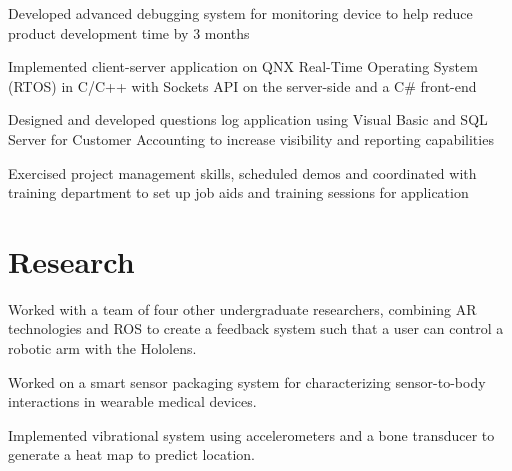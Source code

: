 \documentclass[]{deedy-resume-openfont}
\begin{document}
\begin{minipage}[t]{0.66\textwidth}
\begin{tightemize}
\item Developed advanced debugging system for monitoring device to help reduce product development time by 3 months\item Implemented client-server application on QNX Real-Time Operating System (RTOS) in C/C++ with Sockets API on the server-side and  a C\# front-end \end{tightemize}
\sectionsep

\begin{tightemize}
\item Designed and developed questions log application using Visual Basic and SQL Server for Customer Accounting to increase visibility and reporting capabilities \item	Exercised project management skills, scheduled demos and coordinated with training department to set up job aids and training sessions for application \end{tightemize}
\sectionsep


\section{Research}
\begin{tightemize}
\item Worked with a team of four other undergraduate researchers, combining AR technologies and ROS to create a feedback system such that a user can control a robotic arm with the Hololens.
\end{tightemize}

\sectionsep

\begin{tightemize}
\item Worked on a smart sensor packaging system for characterizing sensor-to-body interactions in wearable medical devices. 
\item Implemented vibrational system using accelerometers and a bone transducer to generate a heat map to predict location. 
\end{tightemize}
\sectionsep


\end{minipage}
\end{document}

